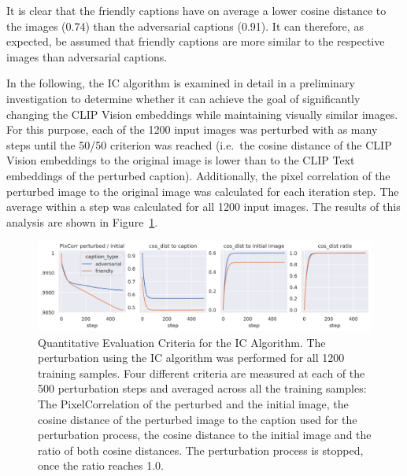 \noindent{}It is clear that the friendly captions have on average a lower cosine distance to the images (0.74) than the adversarial captions (0.91). It can therefore, as expected, be assumed that friendly captions are more similar to the respective images than adversarial captions. 

In the following, the IC algorithm is examined in detail in a preliminary investigation to determine whether it can achieve the goal of significantly changing the CLIP Vision embeddings while maintaining visually similar images. For this purpose, each of the 1200 input images was perturbed with as many steps until the 50/50 criterion was reached (i.e.\ the cosine distance of the CLIP Vision embeddings to the original image is lower than to the CLIP Text embeddings of the perturbed caption). Additionally, the pixel correlation of the perturbed image to the original image was calculated for each iteration step. The average within a step was calculated for all 1200 input images. The results of this analysis are shown in Figure~\ref{fig:advpert_validation_ic_loss_curves}. 


\begin{figure}[ht]
    \centering
    \includegraphics[width=1\textwidth]{plots/advpert_validation_ic_loss_curves.png}
    \caption[Quantitative Evaluation Criteria for the IC Algorithm]{Quantitative Evaluation Criteria for the IC Algorithm. The perturbation using the IC algorithm was performed for all 1200 training samples. Four different criteria are measured at each of the 500 perturbation steps and averaged across all the training samples: The PixelCorrelation of the perturbed and the initial image, the cosine distance of the perturbed image to the caption used for the perturbation process, the cosine distance to the initial image and the ratio of both cosine distances. The perturbation process is stopped, once the ratio reaches 1.0.}\label{fig:advpert_validation_ic_loss_curves}
\end{figure}

